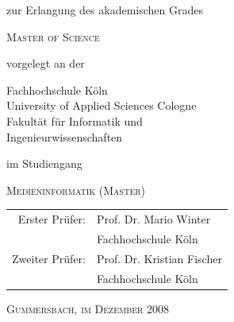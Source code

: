 \begin{titlepage}
\begin{center}
zur Erlangung des akademischen Grades\\
\begin{large}
\textsc{Master of Science}\\ 
\end{large}

\vspace{0.4cm}

vorgelegt an der\\ 
\begin{large}
\begin{scshape}
Fachhochschule Köln\\
University of Applied Sciences Cologne\\
Fakultät für Informatik und\\
Ingenieurwissenschaften\\
\end{scshape}
\end{large}

\vspace{0.4cm}

\vspace{0.2cm}
im Studiengang\\ 
\begin{large}
\textsc{Medieninformatik (Master)}
\end{large}

\vspace{0.7cm}

\begin{tabular}{rl}
         Erster Prüfer: &  Prof. Dr. Mario Winter\\
       							    &  \small Fachhochschule Köln \\[1.0em]
        Zweiter Prüfer: &  Prof. Dr. Kristian Fischer\\
       							    &  \small Fachhochschule Köln \\
\end{tabular}

\vspace{0.5cm}

\textsc{Gummersbach, im Dezember 2008}

\end{center}


\end{titlepage}
